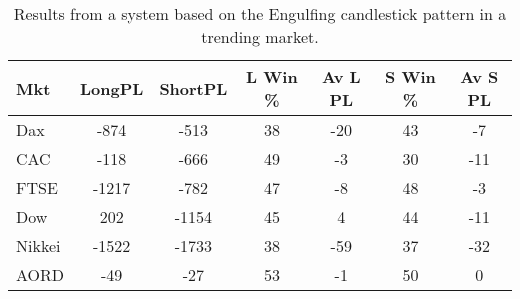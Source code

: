 \begin{table}[ht]
\centering
\caption[Results from a system based on the Engulfing candlestick pattern in a trending market]{Results from a system based on the Engulfing candlestick pattern in a trending market.} 
\label{tab:engulf_aroon_results}
\begin{tabular}{lcccccc}
  \toprule Mkt & LongPL & ShortPL & L Win \% & Av L PL & S Win \% & Av S PL \\ 
  \midrule Dax & -874 & -513 & 38 & -20 & 43 & -7 \\ 
  CAC & -118 & -666 & 49 & -3 & 30 & -11 \\ 
  FTSE & -1217 & -782 & 47 & -8 & 48 & -3 \\ 
  Dow & 202 & -1154 & 45 & 4 & 44 & -11 \\ 
  Nikkei & -1522 & -1733 & 38 & -59 & 37 & -32 \\ 
  AORD & -49 & -27 & 53 & -1 & 50 & 0 \\ 
   \bottomrule \end{tabular}
\end{table}
